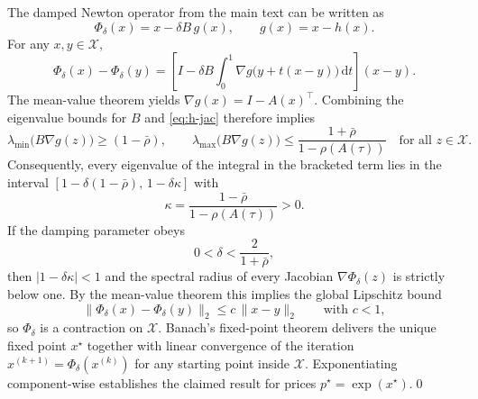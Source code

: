 The damped Newton operator from the main text can be written as
\begin{equation*}
    \Phi_{\delta}(x) = x - \delta B\,g(x), \qquad g(x) = x - h(x).
\end{equation*}
For any $x,y \in \mathcal{X}$,
\begin{equation*}
    \Phi_{\delta}(x) - \Phi_{\delta}(y) = \left[I - \delta B \int_{0}^{1} \nabla g\bigl(y + t(x-y)\bigr)\, \mathrm{d}t\right] (x-y).
\end{equation*}
The mean-value theorem yields $\nabla g(x) = I - A(x)^{\top}$. Combining the eigenvalue bounds for $B$ and \eqref{eq:h-jac} therefore implies
\begin{equation*}
    \lambda_{\min}\bigl( B\nabla g(z)\bigr) \geq (1-\bar{\rho}), \qquad \lambda_{\max}\bigl( B\nabla g(z)\bigr) \leq \frac{1+\bar{\rho}}{1-\rho(A(\tau))} \quad \text{for all } z \in \mathcal{X}.
\end{equation*}
Consequently, every eigenvalue of the integral in the bracketed term lies in the interval $[1-\delta(1-\bar{\rho}),\, 1-\delta\kappa]$ with
\begin{equation*}
    \kappa = \frac{1-\bar{\rho}}{1-\rho(A(\tau))} > 0.
\end{equation*}
If the damping parameter obeys
\begin{equation*}
    0 < \delta < \frac{2}{1+\bar{\rho}},
\end{equation*}
then $|1-\delta\kappa| < 1$ and the spectral radius of every Jacobian $\nabla \Phi_{\delta}(z)$ is strictly below one. By the mean-value theorem this implies the global Lipschitz bound
\begin{equation*}
    \bigl\|\Phi_{\delta}(x) - \Phi_{\delta}(y)\bigr\|_2 \leq c\,\|x-y\|_2 \qquad \text{with } c < 1,
\end{equation*}
so $\Phi_{\delta}$ is a contraction on $\mathcal{X}$. Banach's fixed-point theorem delivers the unique fixed point $x^{\star}$ together with linear convergence of the iteration $x^{(k+1)} = \Phi_{\delta}(x^{(k)})$ for any starting point inside $\mathcal{X}$. Exponentiating component-wise establishes the claimed result for prices $p^{\star} = \exp(x^{\star})$.\qed

